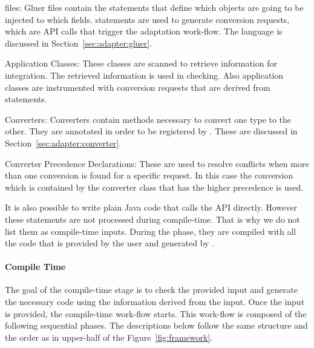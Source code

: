 \begin{description}
\item{\gluer files}: Gluer files contain the \gluer statements that define which objects are going to be injected to which fields. \gluer statements are used to generate conversion requests, which are \zamk API calls that trigger the \zamk adaptation work-flow. The \gluer language is discussed in Section~\ref{sec:adapter:gluer}. 
\item{Application Classes}: These classes are scanned to retrieve information for integration. The retrieved information is used in checking. Also application classes are instrumented with conversion requests that are derived from \gluer statements. 
\item{Converters}: Converters contain methods necessary to convert one type to the other. They are annotated in order to be registered by \zamk. 
These are discussed in Section~\ref{sec:adapter:converter}.
\item{Converter Precedence Declarations}: These are used to resolve conflicts when more than one conversion is found for a specific request. In this case the conversion which is contained by the converter class that has the higher precedence is used. 
\end{description}

It is also possible to write plain Java code that calls the \zamk API directly.
However these statements are not processed during compile-time. 
That is why we do not list them as compile-time inputs. 
During the  phase, they are compiled with all the code that is provided by the user and generated by \zamk.

\paragraph{Compile Time}
The goal of the compile-time stage is to check the provided input and generate the necessary code using the information derived from the input.
Once the input is provided, the \zamk compile-time work-flow starts. This work-flow is composed of the following sequential phases. The descriptions below follow the same structure and the order as in upper-half of the Figure~\ref{fig:framework}. 

